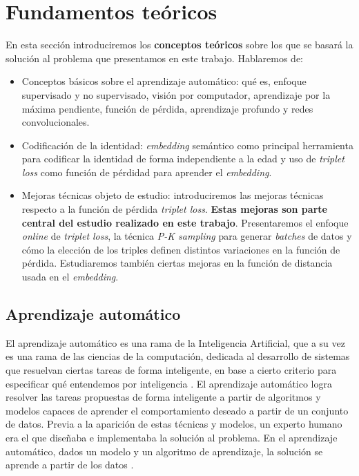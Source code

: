 \chapter{Fundamentos teóricos} \label{ich:fundamentos_teoricos}

En esta sección introduciremos los \textbf{conceptos teóricos} sobre los que se basará la solución al problema que presentamos en este trabajo. Hablaremos de:

\begin{itemize}
    \item Conceptos básicos sobre el aprendizaje automático: qué es, enfoque supervisado y no supervisado, visión por computador, aprendizaje por la máxima pendiente, función de pérdida, aprendizaje profundo y redes convolucionales.
    \item Codificación de la identidad: \textit{embedding} semántico como principal herramienta para codificar la identidad de forma independiente a la edad y uso de \textit{triplet loss} como función de pérdidad para aprender el \textit{embedding}.
    \item Mejoras técnicas objeto de estudio: introduciremos las mejoras técnicas respecto a la función de pérdida \textit{triplet loss}. \textbf{Estas mejoras son parte central del estudio realizado en este trabajo}. Presentaremos el enfoque \textit{online} de \textit{triplet loss}, la técnica \textit{P-K sampling} para generar \textit{batches} de datos y cómo la elección de los triples definen distintos variaciones en la función de pérdida. Estudiaremos también ciertas mejoras en la función de distancia usada en el \textit{embedding}.
\end{itemize}

\section{Aprendizaje automático}

El aprendizaje automático es una rama de la Inteligencia Artificial, que a su vez es una rama de las ciencias de la computación, dedicada al desarrollo de sistemas que resuelvan ciertas tareas de forma inteligente, en base a cierto criterio para especificar qué entendemos por inteligencia \cite{informatica:libro_europa_IA}. El aprendizaje automático logra resolver las tareas propuestas de forma inteligente a partir de algoritmos y modelos capaces de aprender el comportamiento deseado a partir de un conjunto de datos. Previa a la aparición de estas técnicas y modelos, un experto humano era el que diseñaba e implementaba la solución al problema. En el aprendizaje automático, dados un modelo y un algoritmo de aprendizaje, la solución se aprende a partir de los datos \cite{informatica:libro_europa_IA}.

